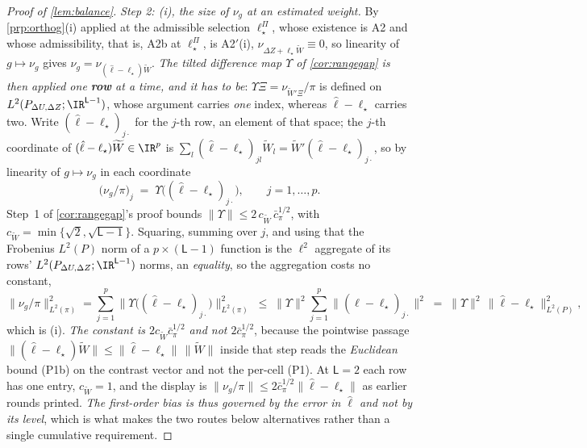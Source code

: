 \begin{proof}[Proof of \cref{lem:balance}]
\emph{Step 2: (i), the size of $\nu_g$ at an estimated weight.}
By \cref{prp:orthog}(i) applied at the admissible selection $\ell^\Pi_\star$, whose existence is A2 and
whose admissibility, that is, A2b at $\ell^\Pi_\star$, is A2$'$(i),
$\nu_{\Delta Z+\ell_\star\widetilde W}\equiv0$, so linearity of $g\mapsto\nu_g$
gives $\nu_g=\nu_{(\hat\ell-\ell_\star)\widetilde W}$.
\emph{The tilted difference map $\Upsilon$ of \cref{cor:rangegap} is then applied one \textbf{row} at a
time, and it has to be}: $\Upsilon\Xi=\nu_{\widetilde W'\Xi}/\pi$ is defined on
$L^{2}(P_{\Delta U,\Delta Z};\IR^{\mathsf L-1})$, whose argument carries \emph{one} index, whereas
$\hat\ell-\ell_\star$ carries two. Write $(\hat\ell-\ell_\star)_{j\cdot}$ for the $j$-th row, an element
of that space; the $j$-th coordinate of $(\hat\ell-\ell_\star)\widetilde W\in\IR^{p}$ is
$\sum_{l}(\hat\ell-\ell_\star)_{jl}\widetilde W_l=\widetilde W'(\hat\ell-\ell_\star)_{j\cdot}$, so by
linearity of $g\mapsto\nu_g$ in each coordinate
\[
\big(\nu_g/\pi\big)_j\;=\;\Upsilon\big((\hat\ell-\ell_\star)_{j\cdot}\big),\qquad j=1,\dots,p .
\]
Step~1 of \cref{cor:rangegap}'s proof bounds
$\|\Upsilon\|\le2\,c_{\widetilde W}\,\bar c_\pi^{1/2}$, with
$c_{\widetilde W}=\min\{\sqrt2,\sqrt{\mathsf L-1}\}$. Squaring, summing over $j$, and using that the
Frobenius $L^{2}(P)$ norm of a $p\times(\mathsf L-1)$ function is the $\ell^{2}$ aggregate of its rows'
$L^{2}(P_{\Delta U,\Delta Z};\IR^{\mathsf L-1})$ norms, an \emph{equality}, so the aggregation costs
no constant, 
\[
\big\|\nu_g/\pi\big\|^{2}_{L^{2}(\pi)}
=\sum_{j=1}^{p}\big\|\Upsilon\big((\hat\ell-\ell_\star)_{j\cdot}\big)\big\|^{2}_{L^{2}(\pi)}
\;\le\;\|\Upsilon\|^{2}\sum_{j=1}^{p}\big\|(\hat\ell-\ell_\star)_{j\cdot}\big\|^{2}
\;=\;\|\Upsilon\|^{2}\,\big\|\hat\ell-\ell_\star\big\|^{2}_{L^{2}(P)} ,
\]
which is (i). \emph{The constant is $2c_{\widetilde W}\bar c_\pi^{1/2}$ and not $2\bar c_\pi^{1/2}$},
because the pointwise passage
$\|(\hat\ell-\ell_\star)\widetilde W\|\le\|\hat\ell-\ell_\star\|\,\|\widetilde W\|$ inside that step
reads the \emph{Euclidean} bound \textup{(P1b)} on the contrast vector and not the per-cell
\textup{(P1)}. At $\mathsf L=2$ each row has one entry, $c_{\widetilde W}=1$, and the display is
$\|\nu_g/\pi\|\le2\bar c_\pi^{1/2}\|\hat\ell-\ell_\star\|$ as earlier rounds printed.
\emph{The first-order bias is thus governed by the
error in $\hat\ell$ and not by its level}, which is what makes the two routes below alternatives rather
than a single cumulative requirement.


\end{proof}
